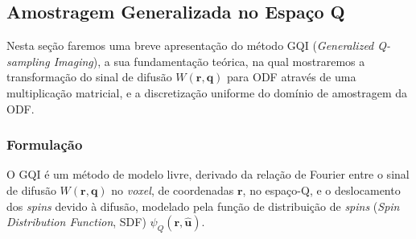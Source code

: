 \documentclass[
    12pt,                %
    oneside,            %
    a4paper,            %
    english,            %
    french,                %
    spanish,            %
    brazil                %
    ]{abntex2}
\begin{document}





\subsection{Amostragem Generalizada no Espaço Q}

Nesta seção faremos uma breve apresentação do método GQI (\textit{Generalized Q-sampling Imaging}), a sua fundamentação teórica, na qual mostraremos a transformação do sinal de difusão $W(\mathbf{r},\mathbf{q})$ para ODF através de uma multiplicação matricial, e a discretização uniforme do domínio de amostragem da ODF.


\label{sec::gqi}
\subsubsection{Formulação}

O GQI é um método de modelo livre, derivado da relação de Fourier entre o sinal de difusão $W(\mathbf{r},  \mathbf{q})$ no \textit{voxel}, de coordenadas $\mathbf{r}$, no espaço-Q, e o deslocamento dos \textit{spins} devido à difusão, modelado pela função de distribuição de \textit{spins} (\textit{Spin Distribution Function}, SDF) $\psi_Q(\mathbf{r}, \mathbf{\hat{u}})$.
\end{document}
